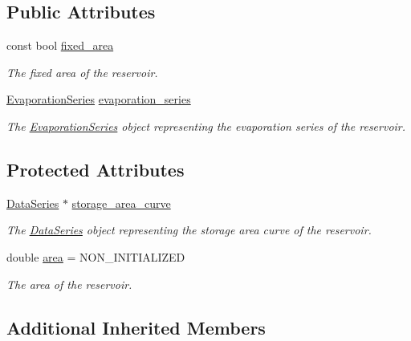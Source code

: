 \subsection*{Public Attributes}
\begin{DoxyCompactItemize}
\item 
const bool \mbox{\hyperlink{classReservoir_ad4b37aef4873071d1766baaccce5b8cf}{fixed\+\_\+area}}
\begin{DoxyCompactList}\small\item\em The fixed area of the reservoir. \end{DoxyCompactList}\item 
\mbox{\hyperlink{classEvaporationSeries}{Evaporation\+Series}} \mbox{\hyperlink{classReservoir_a2d2d9b302c13703309bb798d24136810}{evaporation\+\_\+series}}
\begin{DoxyCompactList}\small\item\em The \mbox{\hyperlink{classEvaporationSeries}{Evaporation\+Series}} object representing the evaporation series of the reservoir. \end{DoxyCompactList}\end{DoxyCompactItemize}
\subsection*{Protected Attributes}
\begin{DoxyCompactItemize}
\item 
\mbox{\hyperlink{classDataSeries}{Data\+Series}} $\ast$ \mbox{\hyperlink{classReservoir_a46bd5b750963dfa9a57b247fd77ab8ff}{storage\+\_\+area\+\_\+curve}}
\begin{DoxyCompactList}\small\item\em The \mbox{\hyperlink{classDataSeries}{Data\+Series}} object representing the storage area curve of the reservoir. \end{DoxyCompactList}\item 
double \mbox{\hyperlink{classReservoir_a57ab55e0dde9e29a4ff97de98b09e458}{area}} = N\+O\+N\+\_\+\+I\+N\+I\+T\+I\+A\+L\+I\+Z\+ED
\begin{DoxyCompactList}\small\item\em The area of the reservoir. \end{DoxyCompactList}\end{DoxyCompactItemize}
\subsection*{Additional Inherited Members}


